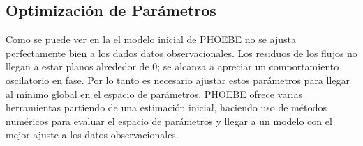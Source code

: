 \subsection{Optimización de Parámetros}

Como se puede ver en la  el modelo inicial
de PHOEBE no se ajusta perfectamente bien a los dados datos observacionales. Los
residuos de los flujos no llegan a estar planos alrededor de 0; se alcanza a
apreciar un comportamiento oscilatorio en fase. Por lo tanto es necesario
ajustar estos parámetros para llegar al mínimo global en el espacio de
parámetros. PHOEBE ofrece varias herramientas partiendo de una estimación
inicial, haciendo uso de métodos numéricos para evaluar el espacio de parámetros
y llegar a un modelo con el mejor ajuste a los datos observacionales. 